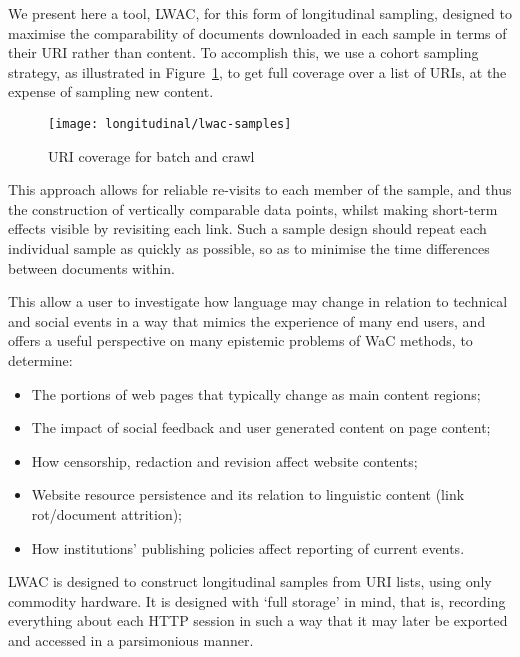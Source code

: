We present here a tool, LWAC, for this form of longitudinal sampling, designed to maximise the comparability of documents downloaded in each sample in terms of their URI rather than content.  To accomplish this, we use a cohort sampling strategy, as illustrated in Figure~\ref{fig:longitudinal:lwac:samples}, to get full coverage over a list of URIs, at the expense of sampling new content.

\begin{figure}[Ht]
    \centering
    \texttt{[image: longitudinal/lwac-samples]}
    \caption{URI coverage for batch and crawl}
    \label{fig:longitudinal:lwac:samples}
\end{figure}

This approach allows for reliable re-visits to each member of the sample, and thus the construction of vertically comparable data points, whilst making short-term effects visible by revisiting each link.  Such a sample design should repeat each individual sample as quickly as possible, so as to minimise the time differences between documents within.


This allow a user to investigate how language may change in relation to technical and social events in a way that mimics the experience of many end users, and offers a useful perspective on many epistemic problems of WaC methods, to determine:

\begin{itemize}
    \item The portions of web pages that typically change as main content regions;
        \vspace{-6pt}
    \item The impact of social feedback and user generated content on page content;
        \vspace{-6pt}
    \item How censorship, redaction and revision affect website contents;
        \vspace{-6pt}
    \item Website resource persistence and its relation to linguistic content (link rot/document attrition);
        \vspace{-6pt}
    \item How institutions' publishing policies affect reporting of current events.
\end{itemize}

LWAC is designed to construct longitudinal samples from URI lists, using only commodity hardware.  It is designed with `full storage' in mind, that is, recording everything about each HTTP session in such a way that it may later be exported and accessed in a parsimonious manner.


